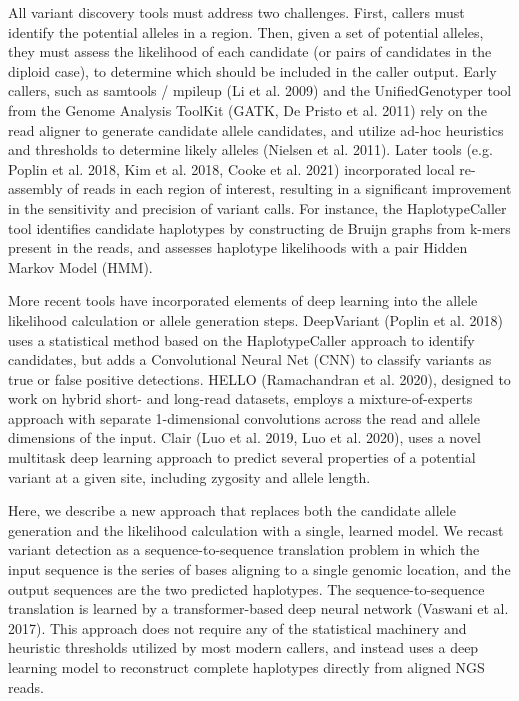 \documentclass[]{article}
\begin{document}
All variant discovery tools must address two challenges. First, callers must identify the potential alleles in a region. Then, given a set of potential alleles, they must assess the likelihood of each candidate (or pairs of candidates in the diploid case), to determine which should be included in the caller output. Early callers, such as samtools / mpileup (Li et al. 2009) and the UnifiedGenotyper tool from the Genome Analysis ToolKit (GATK, De Pristo et al. 2011) rely on the read aligner to generate candidate allele candidates, and utilize ad-hoc heuristics and thresholds to determine likely alleles (Nielsen et al. 2011). Later tools (e.g. Poplin et al. 2018, Kim et al. 2018, Cooke et al. 2021) incorporated local re-assembly of reads in each region of interest, resulting in a significant improvement in the sensitivity and precision of variant calls. For instance, the HaplotypeCaller tool identifies candidate haplotypes by constructing de Bruijn graphs from k-mers present in the reads, and assesses haplotype likelihoods with a pair Hidden Markov Model (HMM). 

More recent tools have incorporated elements of deep learning into the allele likelihood calculation or allele generation steps. DeepVariant (Poplin et al. 2018) uses a statistical method based on the HaplotypeCaller approach to identify candidates, but adds a Convolutional Neural Net (CNN) to classify variants as true or false positive detections. HELLO (Ramachandran et al. 2020), designed to work on hybrid short- and long-read datasets, employs a mixture-of-experts approach with separate 1-dimensional convolutions across the read and allele dimensions of the input. Clair (Luo et al. 2019, Luo et al. 2020), uses a novel multitask deep learning approach to predict several properties of a potential variant at a given site, including zygosity and allele length. 

Here, we describe a new approach that replaces both the candidate allele generation and the likelihood calculation with a single, learned model. We recast variant detection as a sequence-to-sequence translation problem in which the input sequence is the series of bases aligning to a single genomic location, and the output sequences are the two predicted haplotypes. The sequence-to-sequence translation is learned by a transformer-based deep neural network (Vaswani et al. 2017). This approach does not require any of the statistical machinery and heuristic thresholds utilized by most modern callers, and instead uses a deep learning model to reconstruct complete haplotypes directly from aligned NGS reads. 
\end{document}
